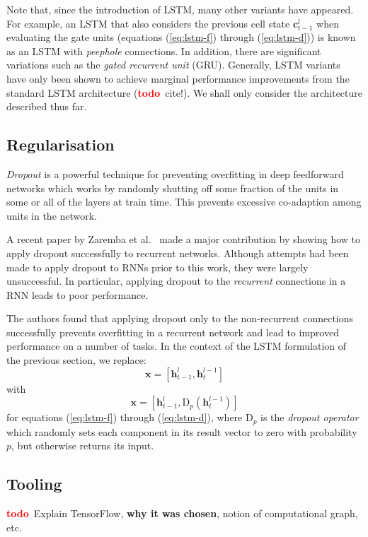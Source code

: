 \documentclass[12pt,a4paper,twoside,openright]{report}
\newcommand{\vect}[1]{\boldsymbol{\mathbf{#1}}}
\newcommand{\todo}{\textcolor{red}{\textbf{todo}~}}
\begin{document}
Note that, since the introduction of LSTM, many other variants have appeared.
For example, an LSTM that also considers the previous cell state
$\vect{c}_{t-1}^l$ when evaluating the gate units (equations (\ref{eq:lstm-f})
through (\ref{eq:lstm-d})) is known as an LSTM with \emph{peephole} connections.
In addition, there are significant variations such as the \emph{gated recurrent
unit} (GRU). Generally, LSTM variants have only been shown to achieve marginal
performance improvements from the standard LSTM architecture (\todo cite!). We
shall only consider the architecture described thus far.

\subsection{Regularisation}

\emph{Dropout} \cite{srivastava2014dropout} is a powerful technique for
preventing overfitting in deep feedforward networks which works by randomly
shutting off some fraction of the units in some or all of the layers at train
time. This prevents excessive co-adaption among units in the network.

A recent paper by Zaremba et al.\ \cite{zaremba2014recurrent} made a major
contribution by showing how to apply dropout successfully to recurrent networks.
Although attempts had been made to apply dropout to RNNs prior to this work,
they were largely unsuccessful. In particular, applying dropout to the
\emph{recurrent} connections in a RNN leads to poor performance.

The authors found that applying dropout only to the non-recurrent connections
successfully prevents overfitting in a recurrent network and lead to improved
performance on a number of tasks. In the context of the LSTM formulation of the
previous section, we replace:
$$ \vect{x} = [\vect{h}_{t-1}^l, \vect{h}_t^{l-1}] $$
with
$$ \vect{x} = [\vect{h}_{t-1}^l, \mathrm{D}_p(\vect{h}_t^{l-1})] $$
for equations (\ref{eq:lstm-f}) through (\ref{eq:lstm-d}), where $\mathrm{D}_p$
is the \emph{dropout operator} which randomly sets each component in its result
vector to zero with probability $p$, but otherwise returns its input. 

\subsection{Tooling}

\todo Explain TensorFlow, \textbf{why it was chosen}, notion of computational
graph, etc.
\end{document}
